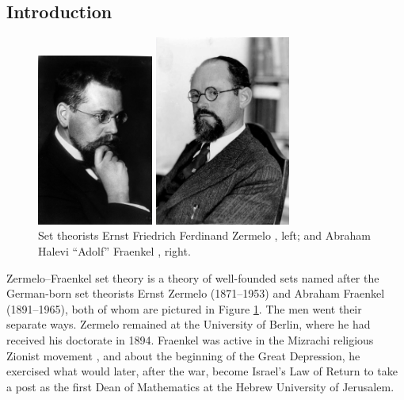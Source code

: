 \documentclass[letterpaper]{article}
\begin{document}
\subsection{Introduction}
\begin{figure}
	\centering
	\begin{minipage}{2in}
		\centering
		\includegraphics[width=1.5in]{PortraitZurich-sw-nb-300.jpg}
	\end{minipage}
	\begin{minipage}{2.25in}
		\centering
		\includegraphics[width=1.75in]{Adolf_Abraham_Halevi_Fraenkel.jpg}
	\end{minipage}
	\caption[Ernst Zermelo and Abraham Fraenkel]{Set theorists Ernst Friedrich Ferdinand Zermelo \cite{mildenberger2014}, left; and Abraham Halevi ``Adolf'' Fraenkel \cite{fraenkel-photo}, right.}\label{zfphoto}
\end{figure}
Zermelo--Fraenkel set theory is a theory of well-founded sets named after the German-born set theorists Ernst Zermelo (1871--1953) and Abraham Fraenkel (1891--1965), both of whom are pictured in Figure \ref{zfphoto}. The men went their separate ways.  Zermelo remained at the University of Berlin, where he had received his doctorate in 1894.  Fraenkel was active in the Mizrachi religious Zionist movement \cite{cohen-mansfield2016}, and about the beginning of the Great Depression, he exercised what would later, after the war, become Israel's Law of Return to take a post as the first Dean of Mathematics at the Hebrew University of Jerusalem.
\end{document}
